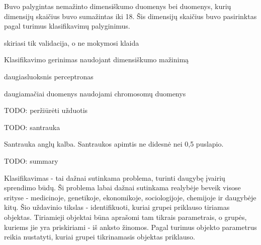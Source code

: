 \documentclass{VUMIFPSbakalaurinis}
\newcommand{\TODO}[1]{
\colorbox{todo-background-color}{TODO: #1}
}
\begin{document}
Buvo palygintas nemažinto dimensiškumo duomenys bei duomenys, kurių dimensijų skaičius buvo sumažintas iki 18.
Šis dimensijų skaičius buvo pasirinktas pagal turimus klasifikavimų palyginimus.

skiriasi tik validacija, o ne mokymosi klaida

Klasifikavimo gerinimas naudojant dimensiškumo mažinimą



daugiasluoksnis perceptronas

daugiamačiai duomenys
naudojami chromosomų duomenys

\TODO{peržiūrėti užduotis}

\TODO{santrauka}










Santrauka anglų kalba. Santraukos apimtis ne didesnė nei 0,5 puslapio.

\TODO{summary}









\tableofcontents









Klasifikavimas - tai dažnai sutinkama problema, turinti daugybę įvairių sprendimo būdų.
Ši problema labai dažnai sutinkama realybėje beveik visose srityse - medicinoje, genetikoje, ekonomikoje, sociologijoje, chemijoje ir daugybėje kitų.
Šio uždavinio tikslas - identifikuoti, kuriai grupei priklauso tiriamas objektas.
Tiriamieji objektai būna aprašomi tam tikrais parametrais, o grupės, kuriems jie yra priskiriami - iš anksto žinomos.
Pagal turimus objekto parametrus reikia nustatyti, kuriai grupei tikrinamasis objektas priklauso.
\end{document}

